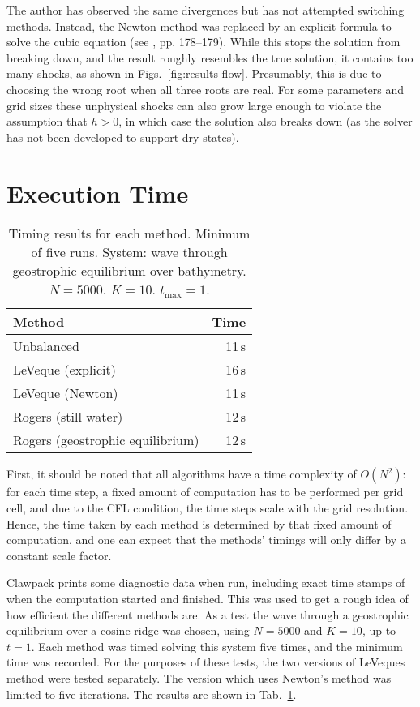 The author has observed the same divergences but has not attempted switching methods. Instead, the Newton method was replaced by an explicit formula to solve the cubic equation (see \citet{press2007numerical}, pp. 178--179). While this stops the solution from breaking down, and the result roughly resembles the true solution, it contains too many shocks, as shown in Figs.~\ref{fig:results-flow}. Presumably, this is due to choosing the wrong root when all three roots are real. For some parameters and grid sizes these unphysical shocks can also grow large enough to violate the assumption that $h > 0$, in which case the solution also breaks down (as the solver has not been developed to support dry states).

\section{Execution Time}

\begin{table}
  \centering
  \begin{tabular}{lr}
    Method & Time \\
    \hline
    Unbalanced & 11\,s \\
    LeVeque (explicit) & 16\,s\\
    LeVeque (Newton) & 11\,s\\
    Rogers (still water) & 12\,s\\
    Rogers (geostrophic equilibrium) & 12\,s
  \end{tabular}
  \caption{Timing results for each method. Minimum of five runs. System: wave through geostrophic equilibrium over bathymetry. $N = 5000$. $K = 10$. $t_{\mathrm{max}} = 1$.}
  \label{tab:timing}
\end{table}

First, it should be noted that all algorithms have a time complexity of $O(N^2)$: for each time step, a fixed amount of computation has to be performed per grid cell, and due to the CFL condition, the time steps scale with the grid resolution. Hence, the time taken by each method is determined by that fixed amount of computation, and one can expect that the methods' timings will only differ by a constant scale factor.

Clawpack prints some diagnostic data when run, including exact time stamps of when the computation started and finished. This was used to get a rough idea of how efficient the different methods are. As a test the wave through a geostrophic equilibrium over a cosine ridge was chosen, using $N = 5000$ and $K = 10$, up to $t = 1$. Each method was timed solving this system five times, and the minimum time was recorded. For the purposes of these tests, the two versions of LeVeques method were tested separately. The version which uses Newton's method was limited to five iterations. The results are shown in Tab.~\ref{tab:timing}.

